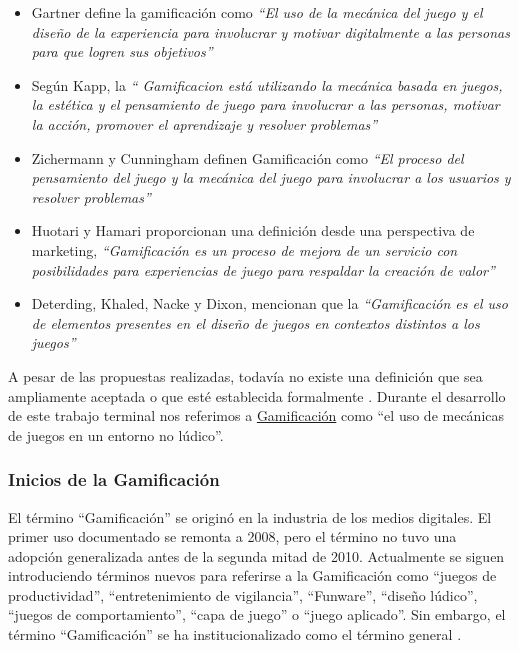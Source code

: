     \begin{itemize}

        \item Gartner define la gamificación como {\it ``El uso de la mecánica del juego y 
        el diseño de la experiencia para involucrar y motivar digitalmente a las personas para 
        que logren sus objetivos''} \cite{Burke}
        
        \item Según Kapp, la {\it`` Gamificacion está utilizando la mecánica basada en juegos, 
        la estética y el pensamiento de juego para involucrar a las personas, motivar la acción, 
        promover el aprendizaje y resolver problemas''} \cite{Kapp} %
        
        \item Zichermann y Cunningham definen Gamificación como {\it ``El proceso del 
        pensamiento del juego y la mecánica del juego para involucrar a los usuarios y resolver 
        problemas''} \cite{GamByDesign} %
        
        \item Huotari y Hamari proporcionan una definición desde una perspectiva de marketing,
        {\it ``Gamificación es un proceso de mejora de un servicio con posibilidades para 
        experiencias de juego para respaldar la creación de valor''} \cite{Huotari}  %
        
        \item Deterding, Khaled, Nacke y Dixon, mencionan que la {\it ``Gamificación
        es el uso de elementos presentes en el diseño de juegos en contextos distintos a
        los juegos''} \cite{DeterdingDefinition} %
    
    \end{itemize}

\noindent A pesar de las propuestas realizadas, todavía no existe una definición que sea ampliamente aceptada o que esté establecida formalmente \cite{Seaborn}. Durante el desarrollo de este trabajo terminal nos referimos a \hyperlink{tGamificacion}{Gamificación} como ``el uso de mecánicas de juegos en un entorno no lúdico''.


\subsubsection{Inicios de la Gamificación}

El término ``Gamificación'' se originó en la industria de los medios digitales. El primer uso documentado se remonta a 2008, pero el término no tuvo una adopción generalizada antes de la segunda mitad de 2010. Actualmente se siguen introduciendo términos nuevos para referirse a la Gamificación como ``juegos de productividad'', ``entretenimiento de vigilancia'', ``Funware'', ``diseño lúdico'', ``juegos de comportamiento'', ``capa de juego'' o ``juego aplicado''. Sin embargo, el término ``Gamificación'' se ha institucionalizado como el término general \cite{DeterdingGamefulness}.\\
    
